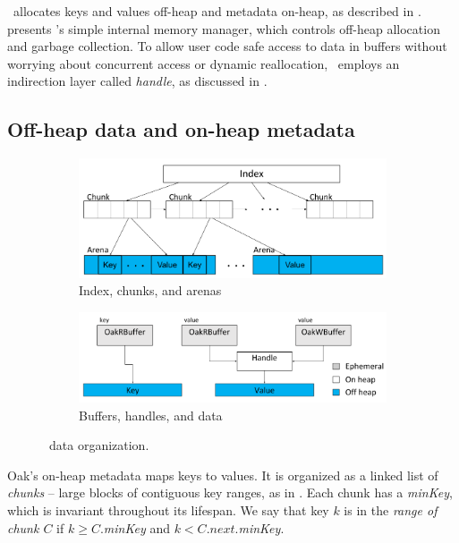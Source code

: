 
\oak\ allocates keys and values off-heap and metadata on-heap, as described in .
  presents \oak's simple internal memory manager, which  controls off-heap allocation and garbage collection.
To allow user code safe access to data in \oak\/ buffers without worrying about concurrent access 
or dynamic reallocation,  \oak\ employs an  indirection layer called \emph{handle}, as discussed in . 

\subsection{Off-heap data and on-heap metadata}
\label{ssec:on-off} 

\begin{figure}[tb]
\setlength\belowcaptionskip{0pt}
\setlength\abovecaptionskip{0pt}
\begin{subfigure}{0.4\linewidth}
\centering
\includegraphics[width=\textwidth]{layout.png}
\caption{Index, chunks, and arenas}
\label{fig:index}
\end{subfigure}
\hfill
\begin{subfigure}{0.515\linewidth}
\centering
\includegraphics[width=\textwidth]{handle.png}
\caption{Buffers, handles, and data}
\label{fig:handle}
\end{subfigure}
\caption{\oak\ data organization.}
\end{figure}

Oak's on-heap metadata maps keys to values. It
is organized as a linked list of \emph{chunks} -- large blocks of contiguous key ranges, as  in \cite{chunks}. 
Each chunk has a \emph{minKey}, which is invariant throughout its lifespan.
We say that key $k$ is in the \emph{range of chunk $C$} if $k \geq C.$\emph{minKey} and $k < C.next.$\emph{minKey}.

